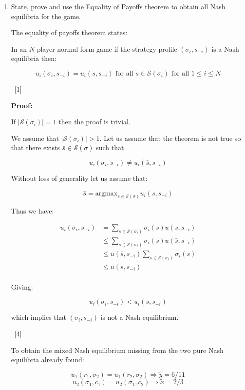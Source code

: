 \documentclass[12pt,a4paper]{article}
\begin{document}
\begin{enumerate}
\begin{enumerate}
\begin{enumerate}
        \item State, prove and use the Equality of Payoffs theorem to obtain all Nash equilibria for
            the game.

            The equality of payoffs theorem states:

            In an $N$ player normal form game if the strategy profile $(\sigma_i,s_{-i})$ is a Nash equilibria then:

            $$u_{i}(\sigma_i,s_{-i})=u_{i}(s,s_{-i})\text{ for all }s\in\mathcal{S}(\sigma_i)\text{ for all }1\leq i\leq N$$

            ~\hfill{[1]}

            \textbf{Proof:}

            If $|\mathcal{S}(\sigma_i)|=1$ then the proof is trivial.

            We assume that $|\mathcal{S}(\sigma_i)|>1$. Let us assume that the theorem is not true so that there exists $\bar s\in\mathcal{S}(\sigma)$ such that

            $$u_{i}(\sigma_i,s_{-i})\ne u_{i}(\bar s,s_{-i})$$

            Without loss of generality let us assume that:

            $$\bar s=\text{argmax}_{s\in\mathcal{S}(\sigma)}u_i(s,s_{-i})$$

            Thus we have:

            $$\begin{aligned}
            u_i(\sigma_i,s_{-i})&=\sum_{s\in\mathcal{S}(\sigma_i)}\sigma_i(s)u(s,s_{-i})\\
            &\leq \sum_{s\in\mathcal{S}(\sigma_i)}\sigma_i(s)u(\bar s,s_{-i})\\
            &\leq u(\bar s,s_{-i})\sum_{s\in\mathcal{S}(\sigma_i)}\sigma_i(s)\\
            &\leq u(\bar s,s_{-i})\\
            \end{aligned}$$

            Giving:

            $$u_{i}(\sigma_i,s_{-i})< u_{i}(\bar s,s_{-i})$$

            which implies that $(\sigma_i,s_{-i})$ is not a Nash equilibrium.

            ~\hfill{[4]}

            To obtain the mixed Nash equilibrium missing from the two pure Nash equilibria already found:

            $$u_1(r_1,\sigma_2)=u_1(r_2,\sigma_2)\Rightarrow \tilde y=6/11$$
            $$u_2(\sigma_1, c_1)=u_2(\sigma_1, c_2)\Rightarrow \tilde x=2/3$$


\end{enumerate}
\end{enumerate}
\end{enumerate}
\end{document}
